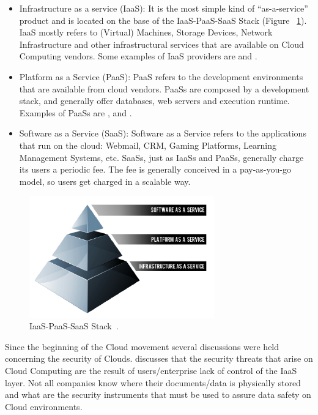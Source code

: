 \begin{itemize}
   \item{Infrastructure as a service (IaaS): It is the most simple kind of ``as-a-service'' product and is located on the base of the IaaS-PaaS-SaaS Stack (Figure ~\ref{fig:cloudstach}). IaaS mostly refers to (Virtual) Machines, Storage Devices, Network Infrastructure and other infrastructural services that are available on Cloud Computing vendors.} Some examples of IaaS providers are \cite{amazonec2} \cite{rackspace} and \cite{azure}. 
   \item{Platform as a Service (PaaS): PaaS refers to the development environments that are available from cloud vendors. PaaSs are composed by a development stack, and generally offer databases, web servers and execution runtime. Examples of PaaSs are \cite{beanstalk}, \cite{azure} and \cite{GAE}.  }
   \item{Software as a Service (SaaS): Software as a Service refers to the applications that run on the cloud: Webmail, CRM, Gaming Platforms, Learning Management Systems, etc. SaaSs, just as IaaSs and PaaSs, generally charge its users a periodic fee. The fee is generally conceived in a pay-as-you-go model, so users get charged in a scalable way.  
}

\end{itemize}



\begin{figure}[ht!]
\centering
\includegraphics[width=80mm]{cloud_stack.png}
\caption{IaaS-PaaS-SaaS Stack~\cite{kepes2011understanding}.\label{fig:cloudstach}}
\end{figure}

Since the beginning of the Cloud movement several discussions were held concerning the security of Clouds. \cite{2010security} discusses that the security threats that arise on Cloud Computing are the result of users/enterprise lack of control of the IaaS layer. Not all companies know where their documents/data is physically stored and what are the security instruments that must be used to assure data safety on Cloud environments.

